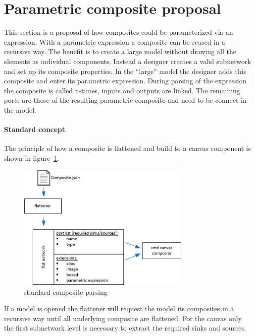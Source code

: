 \section{Parametric composite proposal}

This section is a proposal of how composites could be parameterized via
an expression. With a parametric expression a composite can be reused in a
recursive way. The benefit is to create a large model without drawing all the
elements as individual components. Instead a designer creates a valid subnetwork
and set up its composite properties. In the ``large'' model the designer adds
this composite and enter its parametric expression. During parsing of the
expression the composite is called n-times, inputs and outputs are linked. The
remaining ports are those of the resulting parametric composite and need to be
connect in the model.

\paragraph{Standard concept}

The principle of how a composite is flattened and build to a canvas component is
shown in figure~\ref{fig:standard-composite-parsing}.

\begin{figure}[here]
\includegraphics[width=0.75\textwidth]{pictures/composite-parsing}
\caption{standard composite parsing}
\label{fig:standard-composite-parsing}
\end{figure}

If a model is opened the flattener will request the model its composites in a
recursive way until all underlying composite are flattened. For the canvas only
the first subnetwork level is necessary to extract the required sinks and
sources.

